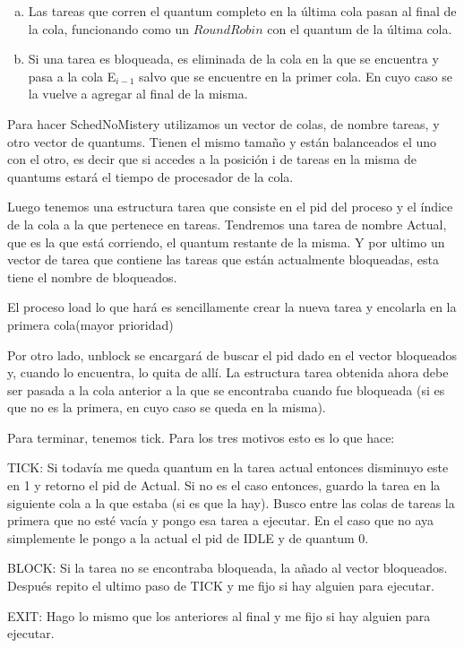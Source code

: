 \begin{enumerate}[(a)]
\item Las tareas que corren el quantum completo en la \'ultima cola pasan al final de la cola, funcionando como un $Round Robin$ con el quantum de la \'ultima cola.
	
\item Si una tarea es bloqueada, es eliminada de la cola en la que se encuentra y pasa a la cola E$_{i-1}$ salvo que se encuentre en la primer cola. En cuyo caso se la vuelve a agregar al final de la misma.

\end{enumerate}

Para hacer SchedNoMistery utilizamos un vector de colas, de nombre tareas, y otro vector de quantums. Tienen el mismo tamaño y están balanceados el uno con el otro, es decir que si accedes a la posición i de tareas en la misma de quantums estará el tiempo de procesador de la cola. 

Luego tenemos una estructura tarea que consiste en el pid del proceso y el índice de la cola a la que pertenece en tareas. Tendremos una tarea de nombre Actual, que es la que está corriendo, el quantum restante de la misma. Y por ultimo un vector de tarea que contiene las tareas que están actualmente bloqueadas, esta tiene el nombre de bloqueados.

El proceso load lo que hará es sencillamente crear la nueva tarea y encolarla en la primera cola(mayor prioridad)

Por otro lado, unblock se encargará de buscar el pid dado en el vector bloqueados y, cuando lo encuentra, lo quita de allí. La estructura tarea obtenida ahora debe ser pasada a la cola anterior a la que se encontraba cuando fue bloqueada (si es que no es la primera, en cuyo caso se queda en la misma).

Para terminar, tenemos tick. Para los tres motivos esto es lo que hace:

TICK: Si todavía me queda quantum en la tarea actual entonces disminuyo este en 1 y retorno el pid de Actual. Si no es el caso entonces, guardo la tarea en la siguiente cola a la que estaba (si es que la hay). Busco entre las colas de tareas la primera que no esté vacía y pongo esa tarea a ejecutar. En el caso que no aya simplemente le pongo a la actual el pid de IDLE y de quantum 0.

 BLOCK: Si la tarea no se encontraba bloqueada, la añado al vector bloqueados. Después repito el ultimo paso de TICK y me fijo si hay alguien para ejecutar.

EXIT: Hago lo mismo que los anteriores al final y me fijo si hay alguien para ejecutar.



